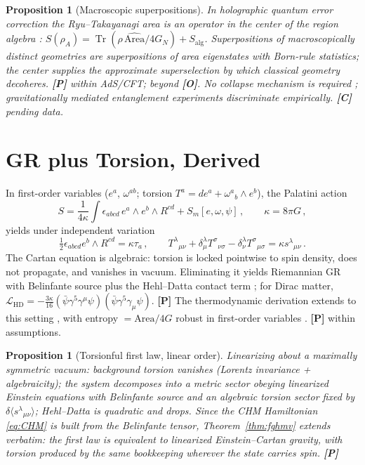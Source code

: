 \documentclass[11pt]{article}
\newtheorem{proposition}[theorem]{Proposition}
\theoremstyle{definition}
\newcommand{\pP}{\textbf{[P]}}
\newcommand{\pC}{\textbf{[C]}}
\newcommand{\pO}{\textbf{[O]}}
\newcommand{\Tr}{\operatorname{Tr}}
\begin{document}
\begin{proposition}[Macroscopic superpositions]
In holographic quantum error correction the Ryu--Takayanagi area is an
operator in the center of the region algebra
\cite{ADH2015,Harlow2017,HaPPY2015}:
$S(\rho_A)=\Tr(\rho\,\widehat{\mathrm{Area}}/4G_N)+S_{\mathrm{alg}}$.
Superpositions of macroscopically distinct geometries are superpositions
of area eigenstates with Born-rule statistics; the center supplies the
approximate superselection by which classical geometry decoheres. \pP{}
within AdS/CFT; beyond \pO{}. No collapse mechanism is required
\cite{Penrose1996}; gravitationally mediated entanglement experiments
\cite{Bose2017,MarlettoVedral2017} discriminate empirically. \pC{}
pending data.
\end{proposition}

\section{GR plus Torsion, Derived}
\label{sec:torsion}

In first-order variables ($e^a$, $\omega^{ab}$; torsion
$T^a=de^a+\omega^a{}_b\wedge e^b$), the Palatini action
\begin{equation}
S=\frac{1}{4\kappa}\int\epsilon_{abcd}\,e^a\wedge e^b\wedge R^{cd}
+S_m[e,\omega,\psi]\,,\qquad\kappa=8\pi G\,,
\label{eq:ECaction}
\end{equation}
yields under independent variation
\cite{Kibble1961,Sciama1964,HehlRMP1976,Trautman2006}
\begin{equation}
\tfrac12\epsilon_{abcd}e^b\wedge R^{cd}=\kappa\tau_a\,,\qquad
T^\lambda{}_{\mu\nu}+\delta^\lambda_\mu T^\sigma{}_{\nu\sigma}
-\delta^\lambda_\nu T^\sigma{}_{\mu\sigma}=\kappa s^\lambda{}_{\mu\nu}\,.
\label{eq:ECeqs}
\end{equation}
The Cartan equation is algebraic: torsion is locked pointwise to spin
density, does not propagate, and vanishes in vacuum. Eliminating it yields
Riemannian GR with Belinfante source plus the Hehl--Datta contact term
\cite{HehlDatta1971}; for Dirac matter,
$\mathcal L_{\mathrm{HD}}=-\tfrac{3\kappa}{16}
(\bar\psi\gamma^5\gamma^\mu\psi)(\bar\psi\gamma^5\gamma_\mu\psi)$. \pP{}
The thermodynamic derivation extends to this setting
\cite{DLP2017,DDS2018}, with entropy $=\mathrm{Area}/4G$ robust in
first-order variables \cite{JacobsonMohd2015}. \pP{} within assumptions.

\begin{proposition}[Torsionful first law, linear order]
\label{prop:ECfirstlaw}
Linearizing about a maximally symmetric vacuum: background torsion
vanishes (Lorentz invariance + algebraicity); the system decomposes into a
metric sector obeying linearized Einstein equations with Belinfante source
and an algebraic torsion sector fixed by
$\delta\langle s^\lambda{}_{\mu\nu}\rangle$; Hehl--Datta is quadratic and
drops. Since the CHM Hamiltonian \eqref{eq:CHM} is built from the
Belinfante tensor, Theorem~\ref{thm:fghmv} extends verbatim: the first
law is equivalent to linearized Einstein--Cartan gravity, with torsion
produced by the same bookkeeping wherever the state carries spin. \pP{}
\end{proposition}
\end{document}

